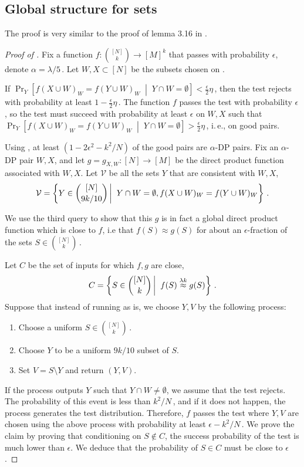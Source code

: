 \documentclass[11pt]{article}
\numberwithin{equation}{section}
\theoremstyle{definition}
\theoremstyle{plain}
\newcommand{\ie}{i.\,e.}
\newcommand{\Prob}[2][]{\Pr_{{#1}}\left[#2\right]} %
\newcommand{\given}{\;\middle\vert\;} %
\newcommand\sett[2]{\left\{ #1 \left| \; \vphantom{#1 #2} \right. #2  \right\}} %
\newcommand\f{f} %
\newcommand\setf{f} %
\newcommand{\g}{g} %
\newcommand\neql[1]{\stackrel{{#1}}{ \approx}} %
\newcommand{\sets}{\binom{[N]}{k}} %
\newcommand\cons{\mathcal{V}} %
\begin{document}
\subsection{Global structure for sets}\label{sec:global for sets}
%
The proof is very similar to the proof of lemma 3.16 in \cite{impagliazzo2012new}.
\begin{proof}[Proof of ]
	Fix a function $\setf:\sets\rightarrow[M]^k$ that passes  with probability $\epsilon$, denote $\alpha = 
	\lambda/5$\,. %
	Let $W,X\subset [N]$ be the subsets chosen on .
	
	If $\Prob[Y]{\f(X\cup W)_W = \f(Y\cup W)_W\given  Y\cap W=\emptyset} < \frac{\epsilon}{2}\eta$\,, then the test rejects with probability at least $1-\frac{\epsilon}{2}\eta$\,.
	The function $\setf$ passes the test with probability $\epsilon$, so the test must succeed with probability at least $\epsilon$ on $W,X$ such that $\Prob[Y]{\f(X\cup W)_W = \f(Y\cup W)_W\given  Y\cap W=\emptyset} > \frac{\epsilon}{2}\eta$\,, \ie, on good pairs.
	
	Using , at least $(1-2\epsilon^2-
	k^2/N %
	)$ of the good pairs are $\alpha$-DP pairs.
	Fix an $\alpha$-DP pair $W,X$, and let $\g=\g_{X,W}:[N]\rightarrow[M]$ be the direct product function associated with $W,X$. Let $\cons$ be all the sets $Y$ that are consistent with $W,X$,
	\[ \cons=\sett{Y\in\binom{[N]}{9k/10 }}{Y\cap W=\emptyset,\setf(X\cup W)_W=\setf(Y\cup W)_W}\,.\]%
	
	We use the third query to show that this $\g$ is in fact a global direct product function which is close to $\setf$, i.e that $\setf(S)\approx \g(S)$ for about an $\epsilon$-fraction of the sets $S\in\binom{[N]}{k}$\,.
	
	Let $C$ be the set of inputs for which $\f,\g$ are close,
	\[ C = \sett{S\in\binom{[N]}{k}}{\setf(S)\neql{\lambda k}\g(S)}\,. \]%
	Suppose that instead of running  as is, we choose $Y,V$ by the following process:
	\begin{enumerate}
		\item Choose a uniform $S\in\binom{[N]}{k}$\,.
		\item Choose $Y$ to be a uniform $9k/10$ subset of $S$.
		\item Set $V=S\setminus Y$ and return $(Y,V)$.
	\end{enumerate}
	If the process outputs $Y$ such that $Y\cap W\neq\emptyset$, we assume that the test rejects. The probability of this event is less than 
	$k^2/N$\,, %
and if it %
does not %
happen, %
 the process generates the test distribution. Therefore, $\setf$ passes the test where $Y,V$ are chosen using the above process with probability at least $\epsilon - 
	k^2/N$\,. %
	We prove the claim by proving that conditioning on $S\notin C$, the success probability of the test is much lower than $\epsilon$. We deduce that the probability of $S\in C$ must be close to $\epsilon$.
	

\end{proof}
\end{document}
